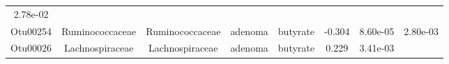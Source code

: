 \documentclass[11pt,]{article}
\begin{document}
\begin{longtable}[]{@{}cccccccc@{}}
\begin{minipage}[t]{0.08\columnwidth}
2.78e-02\strut
\end{minipage}\tabularnewline
\begin{minipage}[t]{0.08\columnwidth}\centering\strut
Otu00254\strut
\end{minipage} & \begin{minipage}[t]{0.15\columnwidth}\centering\strut
Ruminococcaceae\strut
\end{minipage} & \begin{minipage}[t]{0.15\columnwidth}\centering\strut
Ruminococcaceae\strut
\end{minipage} & \begin{minipage}[t]{0.08\columnwidth}\centering\strut
adenoma\strut
\end{minipage} & \begin{minipage}[t]{0.09\columnwidth}\centering\strut
butyrate\strut
\end{minipage} & \begin{minipage}[t]{0.07\columnwidth}\centering\strut
-0.304\strut
\end{minipage} & \begin{minipage}[t]{0.08\columnwidth}\centering\strut
8.60e-05\strut
\end{minipage} & \begin{minipage}[t]{0.08\columnwidth}\centering\strut
2.80e-03\strut
\end{minipage}\tabularnewline
\begin{minipage}[t]{0.08\columnwidth}\centering\strut
Otu00026\strut
\end{minipage} & \begin{minipage}[t]{0.15\columnwidth}\centering\strut
Lachnospiraceae\strut
\end{minipage} & \begin{minipage}[t]{0.15\columnwidth}\centering\strut
Lachnospiraceae\strut
\end{minipage} & \begin{minipage}[t]{0.08\columnwidth}\centering\strut
adenoma\strut
\end{minipage} & \begin{minipage}[t]{0.09\columnwidth}\centering\strut
butyrate\strut
\end{minipage} & \begin{minipage}[t]{0.07\columnwidth}\centering\strut
0.229\strut
\end{minipage} & \begin{minipage}[t]{0.08\columnwidth}\centering\strut
3.41e-03\strut
\end{minipage} & \begin{minipage}[t]{0.08\columnwidth}\centering\strut

\end{minipage}
\end{longtable}
\end{document}
